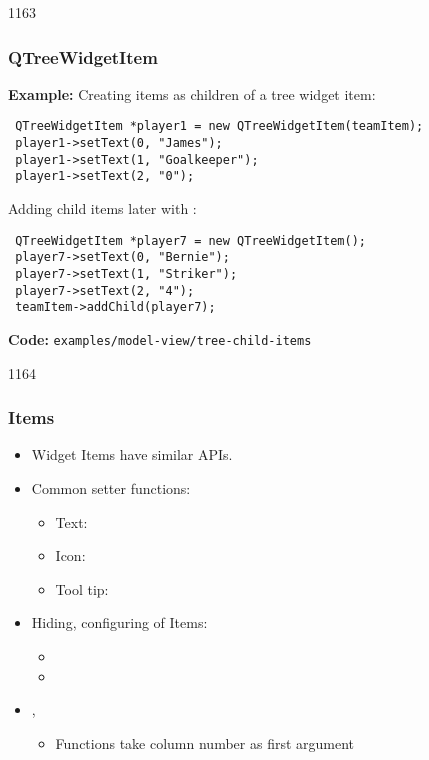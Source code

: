 \begin{slide}[fragile]{1163}\frametitle{QTreeWidgetItem}

\textbf{Example:} Creating items as children of a tree widget item:

\vspace*{0.5em}
\begin{lstlisting}
 QTreeWidgetItem *player1 = new QTreeWidgetItem(teamItem);
 player1->setText(0, "James");
 player1->setText(1, "Goalkeeper");
 player1->setText(2, "0");
\end{lstlisting}

\vspace*{0.5em}
Adding child items later with :

\vspace*{0.5em}
\begin{lstlisting}
 QTreeWidgetItem *player7 = new QTreeWidgetItem();
 player7->setText(0, "Bernie");
 player7->setText(1, "Striker");
 player7->setText(2, "4");
 teamItem->addChild(player7);
\end{lstlisting}

\vspace*{1em}
\textbf{Code:} \texttt{examples/model-view/tree-child-items}
\end{slide}

\begin{slide}{1164}\frametitle{Items}

\begin{itemize}
\item Widget Items have similar APIs.
\item Common setter functions:
  \begin{itemize}
  \item Text: 
  \item Icon: 
  \item Tool tip: 
  \end{itemize}
\item Hiding, configuring of Items:
  \begin{itemize}
  \item {}
  \item {}
  \end{itemize}
  
\item {}, 
  \begin{itemize}
  \item Functions take column number as first argument
  \end{itemize}
\end{itemize}

\end{slide}


